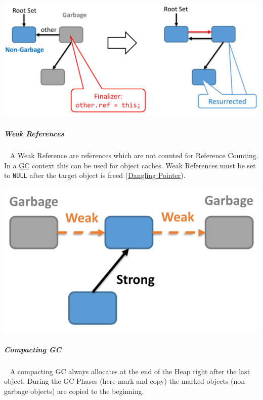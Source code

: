\documentclass[11pt,twoside,landscape]{article}
\begin{document}
\begin{multicols}{3}
{
\begin{center}
\includegraphics[width=.9\linewidth]{img/resurrection_example.png}
\end{center}
\label{fig:resurrection-example}
}
\subparagraph{Weak References} \
\label{sec:orgb636b19}
A Weak Reference are references which are not counted for Reference Counting.
In a \href{../../../roam/20211008083744-garbage_collection.org}{GC} context this can be used for object caches.
Weak References must be set to \texttt{NULL} after the target object is freed (\href{../../../roam/20221230183145-what_is_a_dangling_pointer.org}{Dangling Pointer}).

{
\begin{center}
\includegraphics[width=.9\linewidth]{img/weak_reference.png}
\end{center}
\label{fig:weak-reference-example}
}

\subparagraph{Compacting GC} \
\label{sec:org2f4c098}
A compacting GC always allocates at the end of the Heap right after the last object.
During the GC Phases (here mark and copy) the marked objects (non-garbage objects) are copied to the beginning.



\end{multicols}
\end{document}

